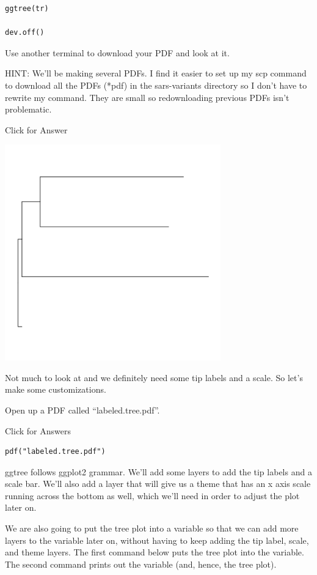 \documentclass[
]{book}
\begin{document}
\begin{verbatim}
ggtree(tr)

dev.off()
\end{verbatim}

Use another terminal to download your PDF and look at it.

HINT: We'll be making several PDFs. I find it easier to set up my scp command to download all the PDFs (*pdf) in the sars-variants directory so I don't have to rewrite my command. They are small so redownloading previous PDFs isn't problematic.

Click for Answer

\includegraphics[width=0.7\textwidth,height=\textheight]{./Figures/basic.tree.png}

\hfill\break

Not much to look at and we definitely need some tip labels and a scale. So let's make some customizations.

Open up a PDF called ``labeled.tree.pdf''.

Click for Answers

\begin{verbatim}
pdf("labeled.tree.pdf")
\end{verbatim}

\hfill\break

ggtree follows ggplot2 grammar. We'll add some layers to add the tip labels and a scale bar. We'll also add a layer that will give us a theme that has an x axis scale running across the bottom as well, which we'll need in order to adjust the plot later on.

We are also going to put the tree plot into a variable so that we can add more layers to the variable later on, without having to keep adding the tip label, scale, and theme layers. The first command below puts the tree plot into the variable. The second command prints out the variable (and, hence, the tree plot).
\end{document}
